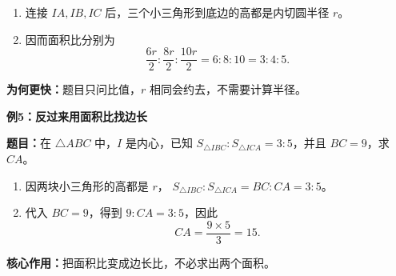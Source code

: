 \begin{examplebox}
\begin{enumerate}[leftmargin=*,itemsep=0.4em]
 \item 连接 $IA,IB,IC$ 后，三个小三角形到底边的高都是内切圆半径 $r$。
 \item 因而面积比分别为
 \[
  \frac{6r}{2}:\frac{8r}{2}:\frac{10r}{2}
  =6:8:10=\boxed{3:4:5}.
 \]
\end{enumerate}
\textbf{为何更快：}题目只问比值，$r$ 相同会约去，不需要计算半径。

\medskip
\par\noindent\begin{minipage}{\linewidth}
\textbf{\textcolor{CExample}{例5：反过来用面积比找边长}}

\textbf{题目：}在 $\triangle ABC$ 中，$I$ 是内心，已知
$S_{\triangle IBC}:S_{\triangle ICA}=3:5$，并且 $BC=9$，求 $CA$。
\end{minipage}\par

\begin{enumerate}[leftmargin=*,itemsep=0.4em]
 \item 因两块小三角形的高都是 $r$，
 $S_{\triangle IBC}:S_{\triangle ICA}=BC:CA=3:5$。
 \item 代入 $BC=9$，得到 $9:CA=3:5$，因此
 \[
  CA=\frac{9\times5}{3}=\boxed{15}.
 \]
\end{enumerate}
\textbf{核心作用：}把面积比变成边长比，不必求出两个面积。
\end{examplebox}
